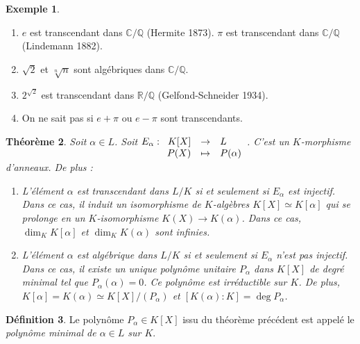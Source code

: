 \documentclass{article}
\newcommand{\Q}{\mathbb{Q}}
\newcommand{\R}{\mathbb{R}}
\newcommand{\C}{\mathbb{C}}
\newcommand{\applic}[4]{\begin{array}[t]{rcl}
#1 & \to & #2 \\
#3 & \mapsto & #4
\end{array}}
\theoremstyle{plain}
\newtheorem{theorem}{Théorème}[subsection]
\theoremstyle{definition}
\newtheorem{definition}[theorem]{Définition}
\newtheorem{example}[theorem]{Exemple}
\theoremstyle{remark}
\begin{document}
\begin{example} \leavevmode
    \begin{enumerate}
        \item $e$ est transcendant dans $\C/\Q$ (Hermite 1873). $\pi$ est transcendant dans $\C/\Q$ (Lindemann 1882).
        \item $\sqrt{2}$ et $\sqrt[n]{n}$ sont algébriques dans $\C/\Q$.
        \item $2^{\sqrt{2}}$ est transcendant dans $\R/\Q$ (Gelfond-Schneider 1934).
        \item On ne sait pas si $e+\pi$ ou $e-\pi$ sont transcendants.
    \end{enumerate}
\end{example}

\begin{theorem} \label{thmpolmin}
    Soit $\alpha \in L$. Soit $E_\alpha : \applic{K[X]}{L}{P(X)}{P(\alpha)}$. C'est un $K$-morphisme d'anneaux. De plus :
    \begin{enumerate}
        \item L'élément $\alpha$ est transcendant dans $L/K$ si et seulement si $E_\alpha$ est injectif. Dans ce cas, il induit un isomorphisme de $K$-algèbres $K[X] \simeq K[\alpha]$ qui se prolonge en un $K$-isomorphisme $K(X) \to K(\alpha)$. Dans ce cas, $\dim_K K[\alpha]$ et $\dim_K K(\alpha)$ sont infinies.
        \item L'élément $\alpha$ est algébrique dans $L/K$ si et seulement si $E_\alpha$ n'est pas injectif. Dans ce cas, il existe un unique polynôme unitaire $P_\alpha$ dans $K[X]$ de degré minimal tel que $P_\alpha (\alpha) = 0$. Ce polynôme est irréductible sur $K$. De plus, $K[\alpha] = K(\alpha) \simeq K[X]/(P_\alpha)$ et $[K(\alpha) : K] = \deg P_\alpha$.
    \end{enumerate}
\end{theorem}

\begin{definition}
    Le polynôme $P_\alpha \in K[X]$ issu du théorème précédent est appelé le \emph{polynôme minimal de $\alpha \in L$ sur $K$}.
\end{definition}
\end{document}

